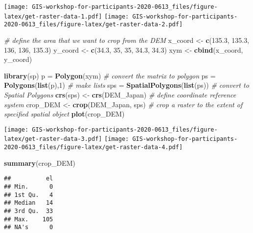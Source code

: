 \documentclass[
  xelatex,ja=standard]{bxjsarticle}
\newenvironment{Shaded}{\begin{snugshade}}{\end{snugshade}}
\newcommand{\CommentTok}[1]{\textcolor[rgb]{0.56,0.35,0.01}{\textit{#1}}}
\newcommand{\DecValTok}[1]{\textcolor[rgb]{0.00,0.00,0.81}{#1}}
\newcommand{\FloatTok}[1]{\textcolor[rgb]{0.00,0.00,0.81}{#1}}
\newcommand{\KeywordTok}[1]{\textcolor[rgb]{0.13,0.29,0.53}{\textbf{#1}}}
\newcommand{\NormalTok}[1]{#1}
\newcommand{\StringTok}[1]{\textcolor[rgb]{0.31,0.60,0.02}{#1}}
\begin{document}
\texttt{[image: GIS-workshop-for-participants-2020-0613\_files/figure-latex/get-raster-data-1.pdf]}
\texttt{[image: GIS-workshop-for-participants-2020-0613\_files/figure-latex/get-raster-data-2.pdf]}

\begin{Shaded}
\begin{Highlighting}[]
\CommentTok{# define the area that we want to crop from the DEM}
\NormalTok{x_coord <-}\StringTok{ }\KeywordTok{c}\NormalTok{(}\FloatTok{135.3}\NormalTok{, }\FloatTok{135.3}\NormalTok{, }\DecValTok{136}\NormalTok{, }\DecValTok{136}\NormalTok{, }\FloatTok{135.3}\NormalTok{)}
\NormalTok{y_coord <-}\StringTok{ }\KeywordTok{c}\NormalTok{(}\FloatTok{34.3}\NormalTok{, }\DecValTok{35}\NormalTok{, }\DecValTok{35}\NormalTok{, }\FloatTok{34.3}\NormalTok{, }\FloatTok{34.3}\NormalTok{)}
\NormalTok{xym <-}\StringTok{ }\KeywordTok{cbind}\NormalTok{(x_coord, y_coord)}

\KeywordTok{library}\NormalTok{(sp)}
\NormalTok{p =}\StringTok{ }\KeywordTok{Polygon}\NormalTok{(xym) }\CommentTok{# convert the matrix to polygon}
\NormalTok{ps =}\StringTok{ }\KeywordTok{Polygons}\NormalTok{(}\KeywordTok{list}\NormalTok{(p),}\DecValTok{1}\NormalTok{) }\CommentTok{# make lists}
\NormalTok{sps =}\StringTok{ }\KeywordTok{SpatialPolygons}\NormalTok{(}\KeywordTok{list}\NormalTok{(ps)) }\CommentTok{# convert to Spatial Polygons}
\KeywordTok{crs}\NormalTok{(sps) <-}\StringTok{ }\KeywordTok{crs}\NormalTok{(DEM_Japan) }\CommentTok{# define coordinate reference system}
\NormalTok{crop_DEM <-}\StringTok{ }\KeywordTok{crop}\NormalTok{(DEM_Japan, sps) }\CommentTok{# crop a raster to the extent of specified spatial object}
\KeywordTok{plot}\NormalTok{(crop_DEM)}
\end{Highlighting}
\end{Shaded}

\texttt{[image: GIS-workshop-for-participants-2020-0613\_files/figure-latex/get-raster-data-3.pdf]}
\texttt{[image: GIS-workshop-for-participants-2020-0613\_files/figure-latex/get-raster-data-4.pdf]}

\begin{Shaded}
\begin{Highlighting}[]
\KeywordTok{summary}\NormalTok{(crop_DEM)}
\end{Highlighting}
\end{Shaded}

\begin{verbatim}
##          el
## Min.      0
## 1st Qu.   4
## Median   14
## 3rd Qu.  33
## Max.    105
## NA's      0
\end{verbatim}
\end{document}
